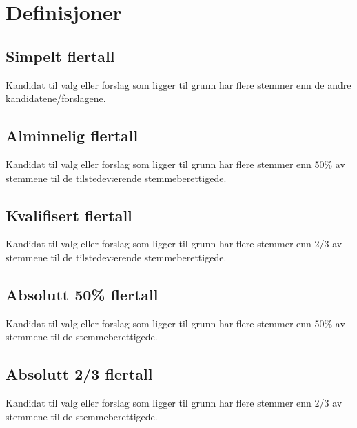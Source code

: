 \section{Definisjoner}
\subsection{Simpelt flertall}
Kandidat til valg eller forslag som ligger til grunn har flere stemmer enn de
andre kandidatene/forslagene.

\subsection{Alminnelig flertall}
Kandidat til valg eller forslag som ligger til grunn har flere stemmer enn 50\%
av stemmene til de tilstedeværende stemmeberettigede.

\subsection{Kvalifisert flertall}
Kandidat til valg eller forslag som ligger til grunn har flere stemmer enn 2/3
av stemmene til de tilstedeværende stemmeberettigede.

\subsection{Absolutt 50\% flertall}
Kandidat til valg eller forslag som ligger til grunn har flere stemmer enn 50\%
av stemmene til de stemmeberettigede.

\subsection{Absolutt 2/3 flertall}
Kandidat til valg eller forslag som ligger til grunn har flere stemmer enn 2/3
av stemmene til de stemmeberettigede.
